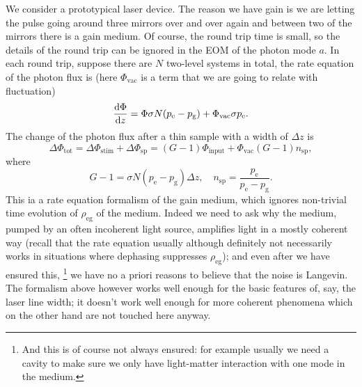 \documentclass[hyperref, a4paper]{article}
\newcommand*{\pope}{p_{\text{e}}}
\newcommand*{\popg}{p_{\text{g}}}
\begin{document}
We consider a prototypical laser device.
The reason we have gain is we are letting the pulse going around three mirrors over and over again 
and between two of the mirrors there is a gain medium.
Of course, the round trip time is small, 
so the details of the round trip can be ignored in the EOM of the photon mode $a$.
In each round trip, suppose there are $N$ two-level systems in total,
the rate equation of the photon flux is 
(here $\Phi_{\text{vac}}$ is a term that we are going to relate with fluctuation)
\begin{equation}
    \dv{\Phi}{z} = \Phi \sigma N (\pope - \popg) + \Phi_{\text{vac}} \sigma \pope.
\end{equation}
The change of the photon flux after a thin sample with a width of $\Delta z$ is 
\begin{equation}
    \Delta \Phi_{\text{tot}} = \Delta \Phi_{\text{stim}} + \Delta \Phi_{\text{sp}}
    = (G - 1) \Phi_{\text{input}} + \Phi_{\text{vac}} (G  -1 ) n_{\text{sp}},
    \label{eq:thin-sample-phi-growth}
\end{equation}
where 
\begin{equation}
    G - 1 = \sigma N (\pope - \popg) \Delta z , \quad 
    n_{\text{sp}} = \frac{\pope}{\pope - \popg}.
\end{equation}
This ia a rate equation formalism of the gain medium,
which ignores non-trivial time evolution of $\rho_{\text{eg}}$ of the medium.
Indeed we need to ask why the medium, pumped by an often incoherent light source,
amplifies light in a mostly coherent way
(recall that the rate equation usually although definitely not necessarily works
in situations where dephasing suppresses $\rho_{\text{eg}}$);
and even after we have ensured this,%
\footnote{
    And this is of course not always ensured:
    for example usually we need a cavity to make sure we only have light-matter interaction
    with one mode in the medium.
}
we have no a priori reasons to believe that the noise is Langevin.
The formalism above however works well enough for the basic features of, say, the laser line width;
it doesn't work well enough for more coherent phenomena which on the other hand are not touched here anyway. 
\end{document}

